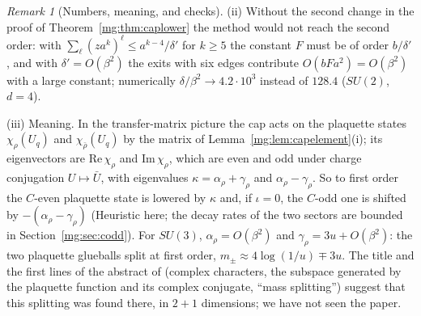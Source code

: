\documentclass[11pt,a4paper]{article}
\theoremstyle{definition}
\theoremstyle{remark}
\newtheorem{remark}[theorem]{Remark}
\begin{document}
\begin{remark}[Numbers, meaning, and checks]
(ii) Without the second change in the proof of Theorem~\ref{mg:thm:caplower} the method would not reach the second order: with $\sum_\ell(za^k)^\ell\le
a^{k-4}/\delta'$ for $k\ge5$ the constant $F$ must be of order $b/\delta'$, and with $\delta'=O(\beta^2)$ the exits with six edges contribute
$O(bFa^2)=O(\beta^2)$ with a large constant; numerically $\delta/\beta^2\to4.2\cdot10^3$ instead of $128.4$ ($SU(2)$, $d=4$).

(iii) Meaning. In the transfer-matrix picture the cap acts on the plaquette states $\chi_\rho(U_q)$ and $\chi_{\bar\rho}(U_q)$ by the matrix of
Lemma~\ref{mg:lem:capelement}(i); its eigenvectors are $\mathrm{Re}\,\chi_\rho$ and $\mathrm{Im}\,\chi_\rho$, which are even and odd under charge conjugation
$U\mapsto\bar U$, with eigenvalues $\kappa=\alpha_\rho+\gamma_\rho$ and $\alpha_\rho-\gamma_\rho$. So to first order the $C$-even plaquette state is lowered by $\kappa$ and, if
$\iota=0$, the $C$-odd one is shifted by $-(\alpha_\rho-\gamma_\rho)$ (Heuristic here; the decay rates of the two sectors are bounded in Section~\ref{mg:sec:codd}). For $SU(3)$, $\alpha_\rho=O(\beta^2)$ and
$\gamma_\rho=3u+O(\beta^2)$: the two plaquette glueballs split at first order, $m_\pm\approx4\log(1/u)\mp3u$. The title and the first lines of the abstract of
\cite{OBS85} (complex characters, the subspace generated by the plaquette function and its complex conjugate, ``mass splitting'') suggest that this
splitting was found there, in $2+1$ dimensions; we have not seen the paper.


\end{remark}
\end{document}
